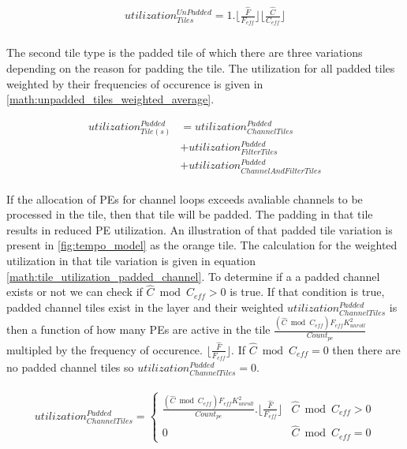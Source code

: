 \begin{align}
    \begin{gathered}
        utilization^{UnPadded}_{Tiles} = 1.\lfloor \frac{\hat{F}}{F_{eff}} \rfloor \lfloor \frac{\hat{C}}{C_{eff}}\rfloor \\
            \end{gathered}
    \label{math:tile_utilization_unpadded}
\end{align}

The second tile type is the padded tile of which there are three variations
depending on the reason for padding the tile. The utilization for all
padded tiles weighted by their frequencies of occurence is given in
\autoref{math:unpadded_tiles_weighted_average}. 

\begin{equation}
    \begin{aligned}
        utilization^{Padded}_{Tile(s)} & = utilization^{Padded}_{ChannelTiles} \\
                                       & + utilization^{Padded}_{FilterTiles} \\
                                       & + utilization^{Padded}_{ChannelAndFilterTiles} \\
    \end{aligned}
    \label{math:unpadded_tiles_weighted_average}
\end{equation}
  
If the allocation of PEs for channel loops exceeds avaliable channels to be
processed in the tile, then that tile will be padded. The padding in that tile results
in reduced PE utilization. An illustration of that padded tile variation is
present in \autoref{fig:tempo_model} as the orange tile.  The calculation for
the weighted utilization in that tile variation is given in equation
\autoref{math:tile_utilization_padded_channel}. To determine if a a padded channel
exists or not we can check if $\hat{C} \bmod C_{eff} > 0$ is true. If that
condition is true, padded channel tiles exist in the layer and their weighted
$utilization^{Padded}_{ChannelTiles}$ is then a function of how many PEs are
active in the tile $\frac{(\hat{C} \bmod C_{eff}) F_{eff}
K_{unroll}^2}{Count_{pe}}$ multipled by the frequency of occurence. $\lfloor
\frac{\hat{F}}{F_{eff}} \rfloor$. If $\hat{C} \bmod C_{eff} = 0$ then there are
no padded channel tiles so $utilization^{Padded}_{ChannelTiles} = 0$.

\begin{align}
    \begin{gathered}
        utilization^{Padded}_{ChannelTiles} = \begin{cases} \frac{(\hat{C} \bmod C_{eff}) F_{eff} K_{unroll}^2}{Count_{pe}}.\lfloor \frac{\hat{F}}{F_{eff}} \rfloor
         & \hat{C} \bmod C_{eff} > 0 \\ 0
         & \hat{C} \bmod C_{eff} = 0 \end{cases} \\
            \end{gathered}
    \label{math:tile_utilization_padded_channel}
\end{align}

